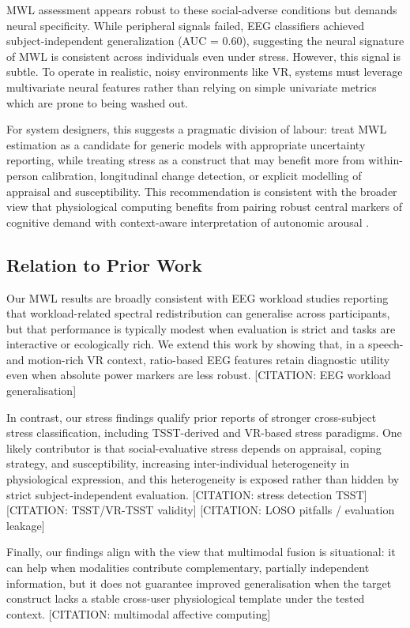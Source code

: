 \documentclass[lettersize,journal]{IEEEtran}
\begin{document}
MWL assessment appears robust to these social-adverse conditions but demands neural specificity. While peripheral signals failed, EEG classifiers achieved subject-independent generalization (AUC = 0.60), suggesting the neural signature of MWL is consistent across individuals even under stress. However, this signal is subtle. To operate in realistic, noisy environments like VR, systems must leverage multivariate neural features rather than relying on simple univariate metrics which are prone to being washed out.

For system designers, this suggests a pragmatic division of labour: treat MWL estimation as a candidate for generic models with appropriate uncertainty reporting, while treating stress as a construct that may benefit more from within-person calibration, longitudinal change detection, or explicit modelling of appraisal and susceptibility. This recommendation is consistent with the broader view that physiological computing benefits from pairing robust central markers of cognitive demand with context-aware interpretation of autonomic arousal \cite{faircloughFundamentalsPhysiologicalComputing2009, dehaisNeuroergonomicsApproachMental2020}.

\subsection{Relation to Prior Work}
Our MWL results are broadly consistent with EEG workload studies reporting that workload-related spectral redistribution can generalise across participants, but that performance is typically modest when evaluation is strict and tasks are interactive or ecologically rich. We extend this work by showing that, in a speech- and motion-rich VR context, ratio-based EEG features retain diagnostic utility even when absolute power markers are less robust. [CITATION: EEG workload generalisation]

In contrast, our stress findings qualify prior reports of stronger cross-subject stress classification, including TSST-derived and VR-based stress paradigms. One likely contributor is that social-evaluative stress depends on appraisal, coping strategy, and susceptibility, increasing inter-individual heterogeneity in physiological expression, and this heterogeneity is exposed rather than hidden by strict subject-independent evaluation. [CITATION: stress detection TSST] [CITATION: TSST/VR-TSST validity] [CITATION: LOSO pitfalls / evaluation leakage]

Finally, our findings align with the view that multimodal fusion is situational: it can help when modalities contribute complementary, partially independent information, but it does not guarantee improved generalisation when the target construct lacks a stable cross-user physiological template under the tested context. [CITATION: multimodal affective computing]
\end{document}
